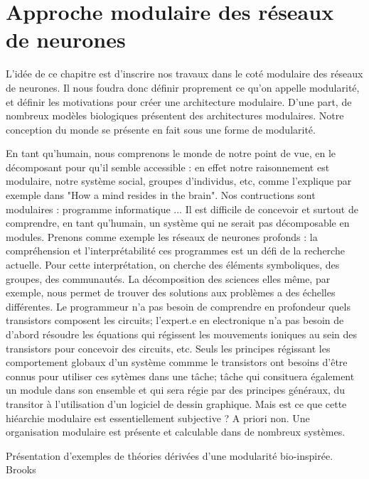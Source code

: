 \chapter{Approche modulaire des réseaux de neurones}
\graphicspath{{01-Modularite/}}

%
L'idée de ce chapitre est d'inscrire nos travaux dans le coté modulaire des réseaux de neurones. Il nous foudra donc définir proprement ce qu'on appelle modularité, et définir les motivations pour créer une architecture modulaire. 
D'une part, de nombreux modèles biologiques présentent des architectures modulaires. Notre conception du monde se présente en fait sous une forme de modularité.

En tant qu'humain, nous comprenons le monde de notre point de vue, en le décomposant pour qu'il semble accessible : en effet notre raisonnement est modulaire, notre système social, groupes d'individus, etc, comme l'explique par exemple \cite{Morowitz1995TheMT} dans "How a mind resides in the brain".
Nos contructions sont modulaires : programme informatique ... Il est difficile de concevoir et surtout de comprendre, en tant qu'humain, un système qui ne serait pas décomposable en modules. Prenons comme exemple les réseaux de neurones profonds : la compréhension  et l'interprétabilité ces programmes est un défi de la recherche actuelle. Pour cette interprétation, on cherche des éléments symboliques, des groupes, des communautés. 
La décomposition des sciences elles même, par exemple, nous permet de trouver des solutions aux problèmes a des échelles différentes. Le programmeur n'a pas besoin de comprendre en profondeur quels transistors composent les circuits; l'expert.e en electronique n'a pas besoin de d'abord résoudre les équations qui régissent les mouvements ioniques au sein des transistors pour concevoir des circuits, etc. Seuls les principes régissant les comportement globaux d'un système commme le transistors ont besoins d'être connus pour utiliser ces sytèmes dans une tâche; tâche qui consituera également un module dans son ensemble et qui sera régie par des principes généraux, du transitor à l'utilisation d'un logiciel de dessin graphique. 
Mais est ce que cette hiéarchie modulaire est essentiellement subjective ? A priori non. Une organisation modulaire est présente et calculable dans de nombreux systèmes.


Présentation d'exemples de théories dérivées d'une modularité bio-inspirée. 
Brooks \cite{brooks_sumsumption_85}


